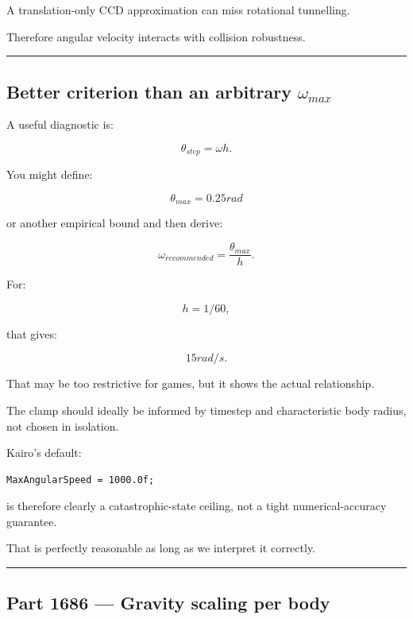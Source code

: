 A translation-only CCD approximation can miss rotational tunnelling.

Therefore angular velocity interacts with collision robustness.

\begin{center}\rule{0.5\linewidth}{0.5pt}\end{center}

\subsection{\texorpdfstring{Better criterion than an arbitrary \(\omega_{max}\)}{Better criterion than an arbitrary \textbackslash omega\_\{max\}}}\label{06-engine-ii-ch038-better-criterion-than-an-arbitrary-omega_max}

A useful diagnostic is:

\[
\theta_{step}
=
\omega h.
\]

You might define:

\[
\theta_{max}=0.25rad
\]

or another empirical bound and then derive:

\[
\omega_{recommended}
=
\frac{\theta_{max}}{h}.
\]

For:

\[
h=1/60,
\]

that gives:

\[
15rad/s.
\]

That may be too restrictive for games, but it shows the actual relationship.

The clamp should ideally be informed by timestep and characteristic body radius, not chosen in isolation.

Kairo's default:

\begin{verbatim}
MaxAngularSpeed = 1000.0f;
\end{verbatim}

is therefore clearly a catastrophic-state ceiling, not a tight numerical-accuracy guarantee.

That is perfectly reasonable as long as we interpret it correctly.

\begin{center}\rule{0.5\linewidth}{0.5pt}\end{center}

\subsection{Part 1686 --- Gravity scaling per body}\label{06-engine-ii-ch038-part-1686-gravity-scaling-per-body}

